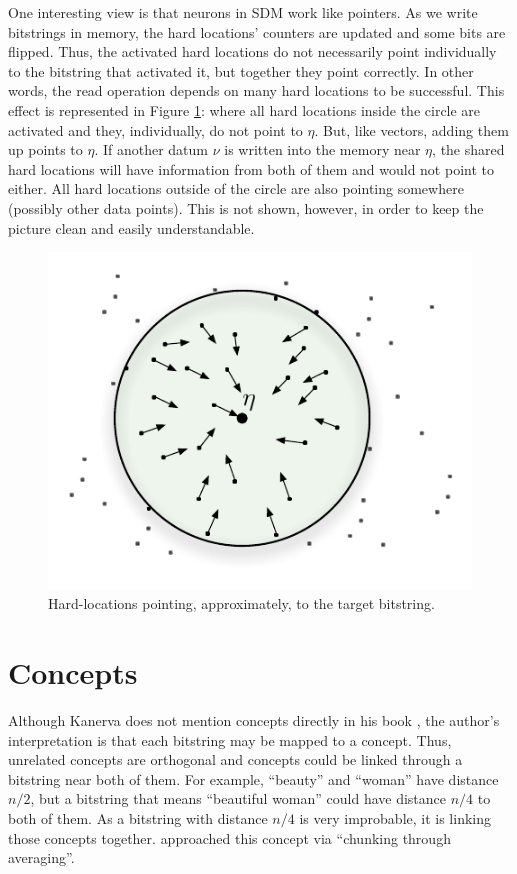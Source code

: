 One interesting view is that neurons in SDM work like pointers. As we write bitstrings in memory, the hard locations' counters are updated and some bits are flipped. Thus, the activated hard locations do not necessarily point individually to the bitstring that activated it, but together they point correctly. In other words, the read operation depends on many hard locations to be successful. This effect is represented in Figure \ref{fig-p1-pointers}: where all hard locations inside the circle are activated and they, individually, do not point to $\eta$.  But, like vectors, adding them up points to $\eta$. If another datum $\nu$ is written into the memory near $\eta$, the shared hard locations will have information from both of them and would not point to either.  All hard locations outside of the circle are also pointing somewhere (possibly other data points). This is not shown, however, in order to keep the picture clean and easily understandable.

\begin{figure}[!htb]
\centering\includegraphics[scale=0.75]{./images02/p1_after_write.pdf}

\caption{Hard-locations pointing, approximately, to the target bitstring.\label{fig-p1-pointers}}
\end{figure}



\section{Concepts}

Although Kanerva does not mention concepts directly in his book \citep{Kanerva1988}, the author's interpretation is that each bitstring may be mapped to a concept. Thus, unrelated concepts are orthogonal and concepts could be linked through a bitstring near both of them. For example, ``beauty'' and ``woman'' have distance $n/2$, but a bitstring that means ``beautiful woman'' could have distance $n/4$ to both of them. As a bitstring with distance $n/4$ is very improbable, it is linking those concepts together. \citet{Linhares2011} approached this concept via ``chunking through averaging''.

